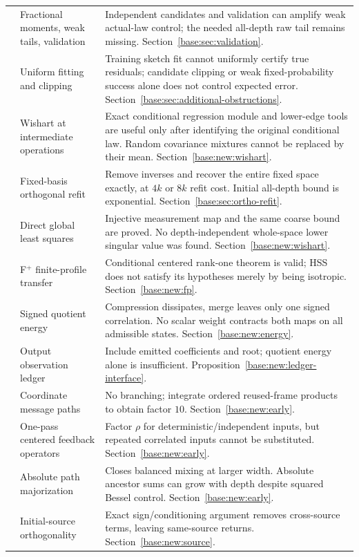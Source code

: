 \documentclass[11pt,oneside,openany,a4paper]{book}
\numberwithin{equation}{chapter}
\theoremstyle{definition}
\theoremstyle{remark}
\begin{document}
\begin{longtable}{@{}>{\RaggedRight\arraybackslash}p{.06\linewidth}>{\RaggedRight\arraybackslash}p{.29\linewidth}>{\RaggedRight\arraybackslash}p{.57\linewidth}@{}}
8&Fractional moments, weak tails, validation&Independent candidates and validation can amplify weak actual-law control; the needed all-depth raw tail remains missing. Section~\ref{base:sec:validation}.\\
9&Uniform fitting and clipping&Training sketch fit cannot uniformly certify true residuals; candidate clipping or weak fixed-probability success alone does not control expected error. Section~\ref{base:sec:additional-obstructions}.\\
10&Wishart at intermediate operations&Exact conditional regression module and lower-edge tools are useful only after identifying the original conditional law. Random covariance mixtures cannot be replaced by their mean. Section~\ref{base:new:wishart}.\\
11&Fixed-basis orthogonal refit&Remove inverses and recover the entire fixed space exactly, at $4k$ or $8k$ refit cost. Initial all-depth bound is exponential. Section~\ref{base:sec:ortho-refit}.\\
12&Direct global least squares&Injective measurement map and the same coarse bound are proved. No depth-independent whole-space lower singular value was found. Section~\ref{base:new:wishart}.\\
13&F$^+$ finite-profile transfer&Conditional centered rank-one theorem is valid; HSS does not satisfy its hypotheses merely by being isotropic. Section~\ref{base:new:fp}.\\
14&Signed quotient energy&Compression dissipates, merge leaves only one signed correlation. No scalar weight contracts both maps on all admissible states. Section~\ref{base:new:energy}.\\
15&Output observation ledger&Include emitted coefficients and root; quotient energy alone is insufficient. Proposition~\ref{base:new:ledger-interface}.\\
16&Coordinate message paths&No branching; integrate ordered reused-frame products to obtain factor $10$. Section~\ref{base:new:early}.\\
17&One-pass centered feedback operators&Factor $\rho$ for deterministic/independent inputs, but repeated correlated inputs cannot be substituted. Section~\ref{base:new:early}.\\
18&Absolute path majorization&Closes balanced mixing at larger width. Absolute ancestor sums can grow with depth despite squared Bessel control. Section~\ref{base:new:early}.\\
19&Initial-source orthogonality&Exact sign/conditioning argument removes cross-source terms, leaving same-source returns. Section~\ref{base:new:source}.\\

\end{longtable}
\end{document}
